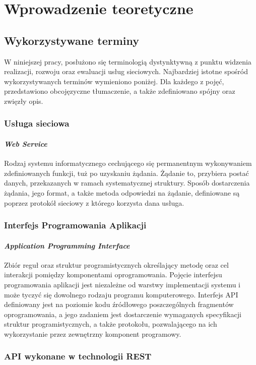 \chapter{Wprowadzenie teoretyczne}
\section{Wykorzystywane terminy}
\label{sec:terminy}
W niniejszej pracy, posłużono się terminologią dystynktywną z punktu widzenia realizacji, rozwoju oraz ewaluacji usług sieciowych. Najbardziej istotne spośród wykorzystywanych terminów wymieniono poniżej. Dla każdego z pojęć, przedstawiono obcojęzyczne tłumaczenie, a także zdefiniowano spójny oraz zwięzły opis.

\subsection*{Usługa sieciowa}
\subsubsection{\textit{Web Service}}
Rodzaj systemu informatycznego cechującego się permanentnym wykonywaniem zdefiniowanych funkcji, tuż po uzyskaniu żądania. Żądanie to, przybiera postać danych, przekazanych w ramach systematycznej struktury. Sposób dostarczenia żądania, jego format, a także metoda odpowiedzi na żądanie, definiowane są poprzez protokół sieciowy z którego korzysta dana usługa.

\subsection*{Interfejs Programowania Aplikacji}
\subsubsection{\textit{Application Programming Interface}}
Zbiór reguł oraz struktur programistycznych określający metodę oraz cel interakcji pomiędzy komponentami oprogramowania. Pojęcie interfejsu programowania aplikacji jest niezależne od warstwy implementacji systemu i może tyczyć się dowolnego rodzaju programu komputerowego. Interfejs API definiowany jest na poziomie kodu źródłowego poszczególnych fragmentów oprogramowania, a jego zadaniem jest dostarczenie wymaganych specyfikacji struktur programistycznych, a także protokołu, pozwalającego na ich wykorzystanie przez zewnętrzny komponent programowy.  

\subsection*{API wykonane w technologii REST}
